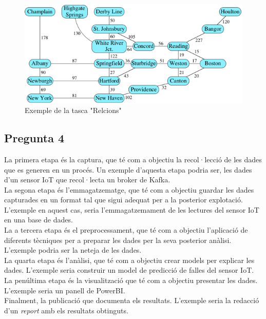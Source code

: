 \documentclass[a4paper,12pt]{report}
\begin{document}
\begin{figure}
    \centering
    \includegraphics[scale =1.3]{images/8aa21944eef2879cea9080a2ae2fbcb98cec0ddf.png}
    \caption{Exemple de la tasca "Relcions"}
    \label{fig:relacions}
\end{figure}
\newpage
\subsection*{Pregunta 4}
La primera etapa és la captura, que té com a objectiu la recol·lecció de les dades que es generen en un procés. Un exemple d'aquesta etapa podria ser, les dades d'un sensor IoT que recol·lecta un broker de Kafka.\\
La segona etapa és l'emmagatzematge, que té com a objectiu guardar les dades capturades en un format tal que sigui adequat per a la posterior explotació. L'exemple en aquest cas, seria l'emmagatzemament de les lectures del sensor IoT en una base de dades.\\
La a tercera etapa és el preprocessament, que té com a objectiu l'aplicació de diferents tècniques per a preparar les dades per la seva posterior anàlisi. L'exemple podria ser la neteja de les dades.\\
La quarta etapa és l'anàlisi, que té com a objectiu crear models per explicar les dades. L'exemple seria construir un model de predicció de falles del sensor IoT.\\
La penúltima etapa és la visualització que té com a objectiu presentar les dades. L'exemple seria un panell de PowerBI.\\
Finalment, la publicació que documenta els resultats. L'exemple seria la redacció d'un \textit{report} amb els resultats obtinguts.
\end{document}
